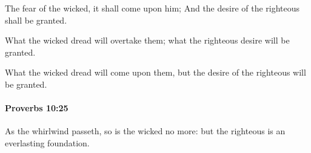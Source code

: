 			\begin{versebox}
					\item[BHS] 
					\item[ASV] The fear of the wicked, it shall come upon him; And the desire of the righteous shall be granted.
					\item[NIV] What the wicked dread will overtake them; what the righteous desire will be granted.
					\item[NRSV] What the wicked dread will come upon them, but the desire of the righteous will be granted.
			\end{versebox}

		\paragraph{Proverbs 10:25} %
			\label{PROVERBS-10-25}

			As the whirlwind passeth, so is the wicked no more: but the righteous is an everlasting foundation.

